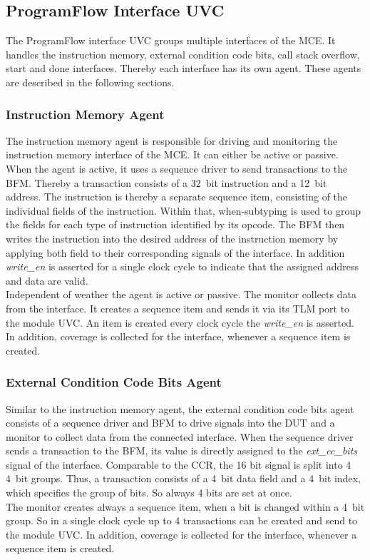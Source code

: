 \subsection{ProgramFlow Interface UVC}

The ProgramFlow interface UVC groups multiple interfaces of the MCE. 
It handles the instruction memory, external condition code bits, call stack overflow, start and done interfaces.
Thereby each interface has its own agent.
These agents are described in the following sections.

\subsubsection{Instruction Memory Agent}

The instruction memory agent is responsible for driving and monitoring the instruction memory interface of the MCE.
It can either be active or passive.
When the agent is active, it uses a sequence driver to send transactions to the BFM.
Thereby a transaction consists of a 32~bit instruction and a 12~bit address.
The instruction is thereby a separate sequence item, consisting of the individual fields of the instruction.
Within that, when-subtyping is used to group the fields for each type of instruction identified by its opcode.
The BFM then writes the instruction into the desired address of the instruction memory by applying both field to their corresponding signals of the interface.
In addition \emph{write\_en} is asserted for a single clock cycle to indicate that the assigned address and data are valid.\\
Independent of weather the agent is active or passive. The monitor collects data from the interface. It creates a sequence item and sends it via its TLM port to
the module UVC. An item is created every clock cycle the \emph{write\_en} is asserted. 
In addition, coverage is collected for the interface, whenever a sequence item is created.


\subsubsection{External Condition Code Bits Agent}

Similar to the instruction memory agent, the external condition code bits agent consists of a sequence driver and BFM to drive signals into the DUT and a
monitor to collect data from the connected interface.
When the sequence driver sends a transaction to the BFM, its value is directly assigned to the \emph{ext\_cc\_bits} signal of the interface.
Comparable to the CCR, the 16 bit signal is split into 4 4~bit groups. Thus, a transaction consists of a 4~bit data field and a 4~bit index, which specifies the
group of bits. So always 4 bits are set at once.\\
The monitor creates always a sequence item, when a bit is changed within a 4~bit group. 
So in a single clock cycle up to 4 transactions can be created and send to the module UVC.
In addition, coverage is collected for the interface, whenever a sequence item is created.

